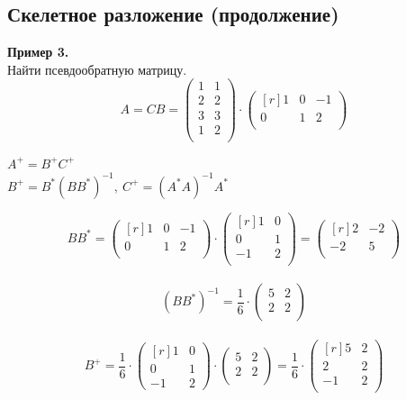 \documentclass[12pt]{article}
\begin{document}
	\subsection{Скелетное разложение (продолжение)}
	\noindent \textbf{Пример 3.}\\
	Найти псевдообратную матрицу.\\
	\[A = CB = \begin{pmatrix}
	1 & 1 \\         
	2 & 2 \\
	3 & 3 \\
	1 & 2 \\
	\end{pmatrix} \cdot \begin{pmatrix}[r]
	1 & 0 & -1 \\         
	0 & 1 & 2 \\
	\end{pmatrix}\]
	\begin{center}
		$A^+=B^+C^+$\\
		$B^+=B^*(BB^*)^{-1}, ~C^+=(A^*A)^{-1}A^*$\\
	\end{center}
	\[BB^* = \begin{pmatrix}[r]
	1 & 0 & -1 \\         
	0 & 1 & 2 \\
	\end{pmatrix} \cdot \begin{pmatrix}[r]
	1 & 0 \\         
	0 & 1 \\
	-1 & 2 \\
	\end{pmatrix} =  \begin{pmatrix}[r]
	2 & -2 \\         
	-2 & 5 \\
	\end{pmatrix}\]\\
	\[(BB^*)^{-1} = \frac{1}{6} \cdot \begin{pmatrix}
	5 & 2 \\         
	2 & 2 \\
	\end{pmatrix}\]\\
	\[B^+ = \frac{1}{6} \cdot \begin{pmatrix}[r]
	1 & 0 \\         
	0 & 1 \\
	-1 & 2
	\end{pmatrix} \cdot \begin{pmatrix}
	5 & 2 \\         
	2 & 2 \\
	\end{pmatrix} = \frac{1}{6} \cdot \begin{pmatrix}[r]
	5 & 2 \\         
	2 & 2 \\
	-1 & 2 \\
	\end{pmatrix}\]\\
\end{document}
